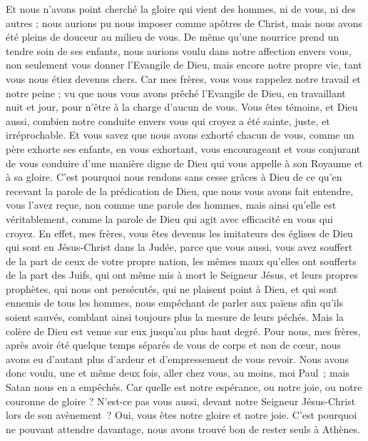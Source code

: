 \begin{multicols}{2}
Et nous n'avons point cherché la gloire qui vient des hommes, ni de vous, ni des autres ; nous aurions pu nous imposer comme apôtres de Christ,
mais nous avons été pleins de douceur au milieu de vous. De même qu’une nourrice prend un tendre soin de ses enfants,
nous aurions voulu dans notre affection envers vous, non seulement vous donner l’Evangile de Dieu, mais encore notre propre vie, tant vous nous étiez devenus chers.
Car mes frères, vous vous rappelez notre travail et notre peine ; vu que nous vous avons prêché l'Evangile de Dieu, en travaillant nuit et jour, pour n'être à la charge d’aucun de vous.
Vous êtes témoins, et Dieu aussi, combien notre conduite envers vous qui croyez a été sainte, juste, et irréprochable.
Et vous savez que nous avons exhorté chacun de vous, comme un père exhorte ses enfants,
en vous exhortant, vous encourageant et vous conjurant de vous conduire d’une manière digne de Dieu qui vous appelle à son Royaume et à sa gloire.
C'est pourquoi nous rendons sans cesse grâces à Dieu de ce qu’en recevant la parole de la prédication de Dieu, que nous vous avons fait entendre, vous l'avez reçue, non comme une parole des hommes, mais ainsi qu'elle est véritablement, comme la parole de Dieu qui agit avec efficacité en vous qui croyez.
En effet, mes frères, vous êtes devenus les imitateurs des églises de Dieu qui sont en Jésus-Christ dans la Judée, parce que vous aussi, vous avez souffert de la part de ceux de votre propre nation, les mêmes maux qu’elles ont soufferts de la part des Juifs,
qui ont même mis à mort le Seigneur Jésus, et leurs propres prophètes, qui nous ont persécutés, qui ne plaisent point à Dieu, et qui sont ennemis de tous les hommes,
nous empêchant de parler aux païens afin qu'ils soient sauvés, comblant ainsi toujours plus la mesure de leurs péchés. Mais la colère de Dieu est venue sur eux jusqu'au plus haut degré.
Pour nous, mes frères, après avoir été quelque temps séparés de vous de corps et non de cœur, nous avons eu d’autant plus d’ardeur et d’empressement de vous revoir.
Nous avons donc voulu, une et même deux fois, aller chez vous, au moins, moi Paul ; mais Satan nous en a empêchés.
Car quelle est notre espérance, ou notre joie, ou notre couronne de gloire ? N’est-ce pas vous aussi, devant notre Seigneur Jésus-Christ lors de son avènement ?
Oui, vous êtes notre gloire et notre joie.
\VerseOne{}C'est pourquoi ne pouvant attendre davantage, nous avons trouvé bon de rester seuls à Athènes.

\end{multicols}
